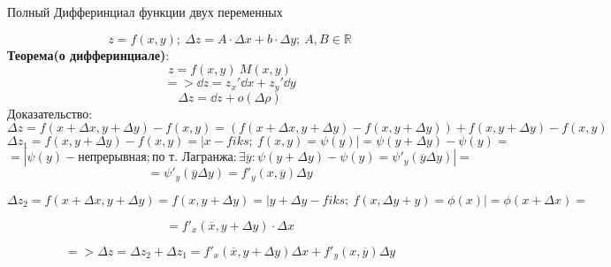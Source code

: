 \documentclass{article}
\begin{document}
Полный Дифферинциал функции двух переменных

\begin{equation*}
    z = f(x, y);\ \Delta z =A \cdot \Delta x + b \cdot \Delta y;\ A, B \in \mathbb{R}
\end{equation*}
\textbf{Теорема(о дифферинциале)}:\\
\begin{equation*}
    z = f(x,y) \ M(x,y)
\end{equation*}
\begin{equation*}
    => \dd z = z_x'\dd x + z_y'\dd y 
\end{equation*}
\begin{equation*}
    \Delta z = \dd z + o(\Delta \rho)
\end{equation*}
Доказательство:\\
\begin{equation*}
    \Delta z = f(x+\Delta x, y +\Delta y) - f(x, y) = (f(x+\Delta x, y + \Delta y) - f(x, y+\Delta y)) + f(x, y+\Delta y)- f(x, y)
\end{equation*}
\begin{equation*}
    \Delta z_1 = f(x, y+\Delta y) - f(x, y) = | x - fiks;\ f(x, y)= \psi(y) | = \psi(y +\Delta y)- \psi (y) = 
\end{equation*}
\begin{equation*}
    =|\psi(y) - \text{непрерывная}; \text{по т. Лагранжа}: \exists \overline{y}: \psi(y + \Delta y) - \psi(y) = \psi'_y(\overline{y}\Delta y) | = 
\end{equation*}
\begin{equation*}
    = \psi'_y(\overline{y}\Delta y) = f'_y(x, \overline{y})\Delta y
\end{equation*}

\begin{equation*}
    \Delta z_2 = f(x + \Delta x, y+  \Delta y) = f(x, y+ \Delta y) = |y+\Delta y - fiks;\ f(x, \Delta y +y) = \phi (x)| = \phi(x + \Delta x) = 
\end{equation*}

\begin{equation*}
    = f'_x(\overline{x}, y+\Delta y)\cdot \Delta x 
\end{equation*}

\begin{equation*}
    => \Delta z = \Delta z_2 +\Delta z_1 = f'_x(\overline{x}, y+\Delta y)\Delta x+ f'_y(x, \overline{y})\Delta y
\end{equation*}
\end{document}
